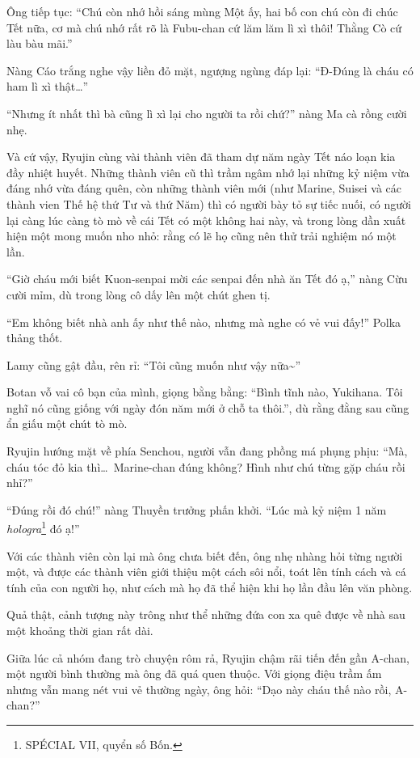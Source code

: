 \documentclass[../main.tex]{subfiles}
\begin{document}
Ông tiếp tục: ``Chú còn nhớ hồi sáng mùng Một ấy, hai bố con chú còn đi chúc Tết nữa, cơ mà chú nhớ rất rõ là Fubu-chan cứ lăm lăm lì xì thôi! Thằng Cò cứ làu bàu mãi.''

Nàng Cáo trắng nghe vậy liền đỏ mặt, ngượng ngùng đáp lại: ``Đ-Đúng là cháu có ham lì xì thật\dots''

``Nhưng ít nhất thì bà cũng lì xì lại cho người ta rồi chứ?'' nàng Ma cà rồng cười nhẹ.

Và cứ vậy, Ryujin cùng vài thành viên đã tham dự năm ngày Tết náo loạn kia đầy nhiệt huyết. Những thành viên cũ thì trầm ngâm nhớ lại những kỷ niệm vừa đáng nhớ vừa đáng quên, còn những thành viên mới (như Marine, Suisei và các thành vien Thế hệ thứ Tư và thứ Năm) thì có người bày tỏ sự tiếc nuối, có người lại càng  lúc càng tò mò về cái Tết có một không hai này, và trong lòng dần xuất hiện một mong muốn nho nhỏ: rằng có lẽ họ cũng nên thử trải nghiệm nó một lần.

``Giờ cháu mới biết Kuon-senpai mời các senpai đến nhà ăn Tết đó ạ,'' nàng Cừu cười mỉm, dù trong lòng cô dấy lên một chút ghen tị.

``Em không biết nhà anh ấy như thế nào, nhưng mà nghe có vẻ vui đấy!'' Polka thảng thốt.

Lamy cũng gật đầu, rên rỉ: ``Tôi cũng muốn như vậy nữa\~{}''

Botan vỗ vai cô bạn của mình, giọng bằng bằng: ``Bình tĩnh nào, Yukihana. Tôi nghĩ nó cũng giống với ngày đón năm mới ở chỗ ta thôi.'', dù rằng đằng sau cũng ẩn giấu một chút tò mò.

Ryujin hướng mặt về phía Senchou, người vẫn đang phồng má phụng phịu: ``Mà, cháu tóc đỏ kia thì\dots\ Marine-chan đúng không? Hình như chú từng gặp cháu rồi nhỉ?''

``Đúng rồi đó chú!'' nàng Thuyền trưởng phấn khởi. ``Lúc mà kỷ niệm 1 năm \textit{hologra}\footnote{{\flaregothic SPÉCIAL} {\ab VII}, quyển số Bốn.} đó ạ!''

Với các thành viên còn lại mà ông chưa biết đến, ông nhẹ nhàng hỏi từng người một, và được các thành viên giới thiệu một cách sôi nổi, toát lên tính cách và cá tính của con người họ, như cách mà họ đã thể hiện khi họ lần đầu lên văn phòng.

Quả thật, cảnh tượng này trông như thể những đứa con xa quê được về nhà sau một khoảng thời gian rất dài.

Giữa lúc cả nhóm đang trò chuyện rôm rả, Ryujin chậm rãi tiến đến gần A-chan, một người bình thường mà ông đã quá quen thuộc. Với giọng điệu trầm ấm nhưng vẫn mang nét vui vẻ thường ngày, ông hỏi: ``Dạo này cháu thế nào rồi, A-chan?''
\end{document}
